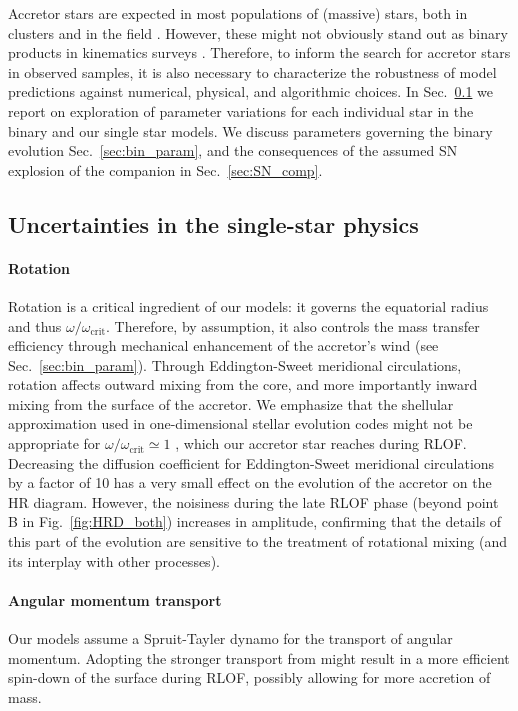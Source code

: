 \documentclass[twocolumn,twocolappendix,trackchanges]{aastex63}
\DeclareRobustCommand{\Figref}[1]{Fig.~\ref{#1}}
\DeclareRobustCommand{\Secref}[1]{Sec.~\ref{#1}}
\begin{document}
Accretor stars are expected in most populations of (massive) stars,
both in clusters \citep[e.g.,][]{chen:09, wang:20} and in the field
\citep[e.g.,][]{demink:11, demink:13, dorigo-jones:20}. However, these might not
obviously stand out as binary products in kinematics surveys
\citep[e.g.,][]{renzo:19walk}. Therefore, to inform the search for
accretor stars in observed samples, it is also necessary to
characterize the robustness of model predictions against numerical,
physical, and algorithmic choices.  In
\Secref{sec:single_star_uncertainties} we report on exploration of
parameter variations for each individual star in the binary and our
single star models. We
discuss parameters governing the binary evolution
\Secref{sec:bin_param}, and the consequences of the assumed SN
explosion of the companion in \Secref{sec:SN_comp}.


\subsection{Uncertainties in the single-star physics}
\label{sec:single_star_uncertainties}

\paragraph{Rotation}
Rotation is a critical ingredient of our models: it governs the
equatorial radius and thus $\omega/\omega_\mathrm{crit}$. Therefore,
by assumption, it also controls the mass transfer efficiency through
mechanical enhancement of the accretor's wind (see
\Secref{sec:bin_param}). Through Eddington-Sweet meridional
circulations, rotation affects outward mixing from the core, and more
importantly inward mixing from the surface of the accretor.  We
emphasize that the shellular approximation used in one-dimensional
stellar evolution codes might not be appropriate for
$\omega/\omega_\mathrm{crit}\simeq 1$ \citep[e.g.][]{maeder:00}, which
our accretor star reaches during RLOF.  Decreasing the diffusion
coefficient for Eddington-Sweet meridional circulations by a factor of
10 has a very small effect on the evolution of the accretor on the HR
diagram. However, the noisiness during the late RLOF phase (beyond
point B in \Figref{fig:HRD_both}) increases in amplitude, confirming
that the details of this part of the evolution are sensitive to the
treatment of rotational mixing (and its interplay with other
processes).

\paragraph{Angular momentum transport}
Our models assume a Spruit-Tayler dynamo \citep{spruit:02} for the
transport of angular momentum. Adopting the
stronger transport from \cite{fuller:19} might result
in a more efficient spin-down of the surface during RLOF, possibly
allowing for more accretion of mass.
\end{document}
